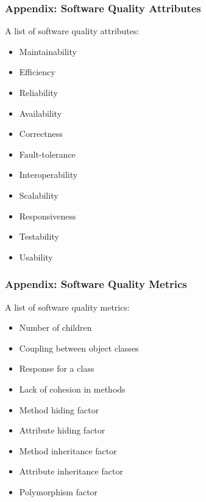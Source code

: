 \begin{frame}
\label{appendix:software_quality_attributes}
\frametitle{Appendix: Software Quality Attributes}

A list of software quality attributes:
\begin{example}
\begin{multicols}{2}
\begin{itemize}
  \item Maintainability
  \item Efficiency
  \item Reliability
  \item Availability
  \item Correctness
  \item Fault-tolerance
  \item Interoperability
  \item Scalability
  \item Responsiveness
  \item Testability
  \item Usability
\end{itemize}
\end{multicols}
\end{example}

\hyperlink{subsection:software_quality}{}

\end{frame}

\begin{frame}
\label{appendix:software_quality_metrics}
\frametitle{Appendix: Software Quality Metrics}

A list of software quality metrics:
\begin{example}
\begin{multicols}{2}
\begin{itemize}
  \item Number of children
  \item Coupling between object classes
  \item Response for a class
  \item Lack of cohesion in methods
  \item Method hiding factor
  \item Attribute hiding factor
  \item Method inheritance factor
  \item Attribute inheritance factor
  \item Polymorphism factor
\end{itemize}
\end{multicols}
\end{example}

\hyperlink{subsection:software_quality_metric}{}

\end{frame}


